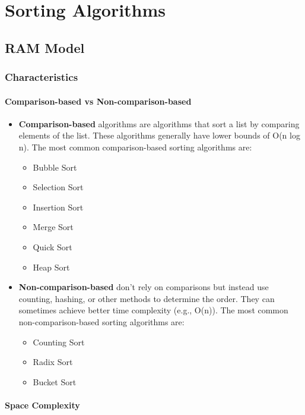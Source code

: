\chapter{Sorting Algorithms}

\section{RAM Model}

\subsection{Characteristics}

\subsubsection*{Comparison-based vs Non-comparison-based}

\begin{itemize}
    \item \textbf{Comparison-based} algorithms are algorithms that sort a list by comparing elements of the list. These algorithms generally have lower bounds of O(n log n). The most common comparison-based sorting algorithms are:
    \begin{itemize}
        \item Bubble Sort
        \item Selection Sort
        \item Insertion Sort
        \item Merge Sort
        \item Quick Sort
        \item Heap Sort
    \end{itemize}
    \item \textbf{Non-comparison-based} don’t rely on comparisons but instead use counting, hashing, or other methods to determine the order. They can sometimes achieve better time complexity (e.g., O(n)). The most common non-comparison-based sorting algorithms are:
    \begin{itemize}
        \item Counting Sort
        \item Radix Sort
        \item Bucket Sort
    \end{itemize}
\end{itemize}

\subsubsection*{Space Complexity}


